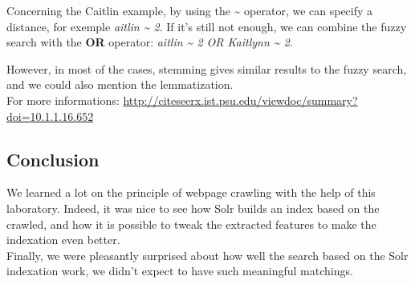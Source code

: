 \documentclass[a4paper]{article}
\begin{document}
Concerning the Caitlin example, by using the \textbf{\~} operator, we can specify a distance, for exemple \textit{aitlin \~{} 2}. If it's still not enough, we can combine the fuzzy search with the \textbf{OR} operator: \textit{aitlin \~{} 2 OR Kaitlynn \~{} 2}.

However, in most of the cases, stemming gives similar results to the fuzzy search, and we could also mention the lemmatization.\\

For more informations: \url{http://citeseerx.ist.psu.edu/viewdoc/summary?doi=10.1.1.16.652}

\subsection{Conclusion}

We learned a lot on the principle of webpage crawling with the help of this laboratory. Indeed, it was nice to see how Solr builds an index based on the crawled, and how it is possible to tweak the extracted features to make the indexation even better.\\

Finally, we were pleasantly surprised about how well the search based on the Solr indexation work, we didn't expect to have such meaningful matchings.
\end{document}
